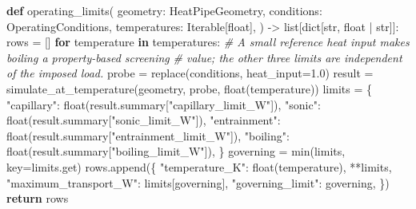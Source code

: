 \documentclass[
  12pt,
  12pt,a4paper,oneside]{report}
\newenvironment{Shaded}{}{}
\newcommand{\BuiltInTok}[1]{\textcolor[rgb]{0.00,0.50,0.00}{#1}}
\newcommand{\CommentTok}[1]{\textcolor[rgb]{0.38,0.63,0.69}{\textit{#1}}}
\newcommand{\ControlFlowTok}[1]{\textcolor[rgb]{0.00,0.44,0.13}{\textbf{#1}}}
\newcommand{\FloatTok}[1]{\textcolor[rgb]{0.25,0.63,0.44}{#1}}
\newcommand{\KeywordTok}[1]{\textcolor[rgb]{0.00,0.44,0.13}{\textbf{#1}}}
\newcommand{\NormalTok}[1]{#1}
\newcommand{\OperatorTok}[1]{\textcolor[rgb]{0.40,0.40,0.40}{#1}}
\newcommand{\StringTok}[1]{\textcolor[rgb]{0.25,0.44,0.63}{#1}}
\begin{document}
\begin{Shaded}
\begin{Highlighting}[]
\KeywordTok{def}\NormalTok{ operating\_limits(}
\NormalTok{    geometry: HeatPipeGeometry,}
\NormalTok{    conditions: OperatingConditions,}
\NormalTok{    temperatures: Iterable[}\BuiltInTok{float}\NormalTok{],}
\NormalTok{) }\OperatorTok{{-}\textgreater{}} \BuiltInTok{list}\NormalTok{[}\BuiltInTok{dict}\NormalTok{[}\BuiltInTok{str}\NormalTok{, }\BuiltInTok{float} \OperatorTok{|} \BuiltInTok{str}\NormalTok{]]:}
\NormalTok{    rows }\OperatorTok{=}\NormalTok{ []}
    \ControlFlowTok{for}\NormalTok{ temperature }\KeywordTok{in}\NormalTok{ temperatures:}
        \CommentTok{\# A small reference heat input makes boiling a property{-}based screening}
        \CommentTok{\# value; the other three limits are independent of the imposed load.}
\NormalTok{        probe }\OperatorTok{=}\NormalTok{ replace(conditions, heat\_input}\OperatorTok{=}\FloatTok{1.0}\NormalTok{)}
\NormalTok{        result }\OperatorTok{=}\NormalTok{ simulate\_at\_temperature(geometry, probe, }\BuiltInTok{float}\NormalTok{(temperature))}
\NormalTok{        limits }\OperatorTok{=}\NormalTok{ \{}
            \StringTok{"capillary"}\NormalTok{: }\BuiltInTok{float}\NormalTok{(result.summary[}\StringTok{"capillary\_limit\_W"}\NormalTok{]),}
            \StringTok{"sonic"}\NormalTok{: }\BuiltInTok{float}\NormalTok{(result.summary[}\StringTok{"sonic\_limit\_W"}\NormalTok{]),}
            \StringTok{"entrainment"}\NormalTok{: }\BuiltInTok{float}\NormalTok{(result.summary[}\StringTok{"entrainment\_limit\_W"}\NormalTok{]),}
            \StringTok{"boiling"}\NormalTok{: }\BuiltInTok{float}\NormalTok{(result.summary[}\StringTok{"boiling\_limit\_W"}\NormalTok{]),}
\NormalTok{        \}}
\NormalTok{        governing }\OperatorTok{=} \BuiltInTok{min}\NormalTok{(limits, key}\OperatorTok{=}\NormalTok{limits.get)}
\NormalTok{        rows.append(\{}
            \StringTok{"temperature\_K"}\NormalTok{: }\BuiltInTok{float}\NormalTok{(temperature),}
            \OperatorTok{**}\NormalTok{limits,}
            \StringTok{"maximum\_transport\_W"}\NormalTok{: limits[governing],}
            \StringTok{"governing\_limit"}\NormalTok{: governing,}
\NormalTok{        \})}
    \ControlFlowTok{return}\NormalTok{ rows}



\end{Highlighting}
\end{Shaded}
\end{document}
